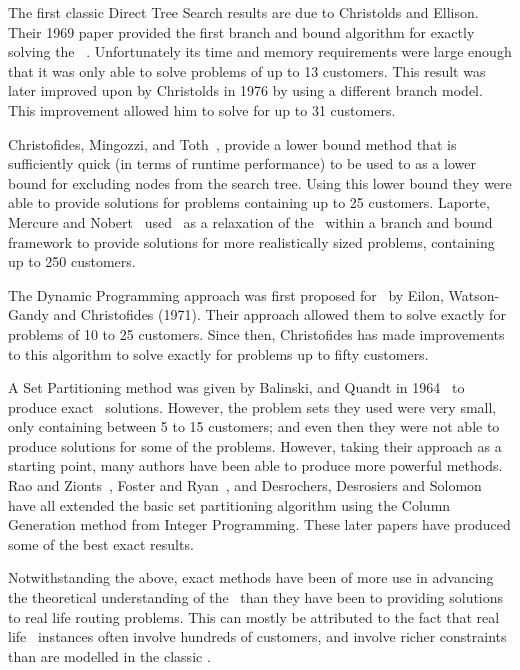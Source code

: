 The first classic Direct Tree Search results are due to Christolds and Ellison. Their 1969 paper provided the first branch and bound algorithm for exactly solving the \VRP~\cite{CE:1969}. Unfortunately its time and memory requirements were large enough that it was only able to solve problems of up to 13 customers. This result was later improved upon by Christolds in 1976 by using a different branch model. This improvement allowed him to solve for up to 31 customers. 

Christofides, Mingozzi, and Toth~\cite{CMT:1981}, provide a lower bound method that is sufficiently quick (in terms of runtime performance) to be used to as a lower bound for excluding nodes from the search tree. Using this lower bound they were able to provide solutions for problems containing up to 25 customers. Laporte, Mercure and Nobert~\cite{LMN:1986} used \MTSP\ as a relaxation of the \VRP\ within a branch and bound framework to provide solutions for more realistically sized problems, containing up to 250 customers.  

The Dynamic Programming approach was first proposed for \VRP\ by Eilon, Watson-Gandy and Christofides (1971). Their approach allowed them to solve exactly for problems of 10 to 25 customers. Since then, Christofides has made improvements to this algorithm to solve exactly for problems up to fifty customers.

A Set Partitioning method was given by Balinski, and Quandt in 1964~\cite{balinski:64} to produce exact \VRP\ solutions. However, the problem sets they used were very small, only containing between 5 to 15 customers; and even then they were not able to produce solutions for some of the problems. However, taking their approach as a starting point, many authors have been able to produce more powerful methods. Rao and Zionts~\cite{RZ:1968}, Foster and Ryan~\cite{FR:1976}, and Desrochers, Desrosiers and Solomon~\cite{DMDJSM:1992} have all extended the basic set partitioning algorithm using the Column Generation method from Integer Programming. These later papers have produced some of the best exact results. 

Notwithstanding the above, exact methods have been of more use in advancing the theoretical understanding of the \VRP\ than they have been to providing solutions to real life routing problems. This can mostly be attributed to the fact that real life \VRP\ instances often involve hundreds of customers, and involve richer constraints than are modelled in the classic \VRP.

